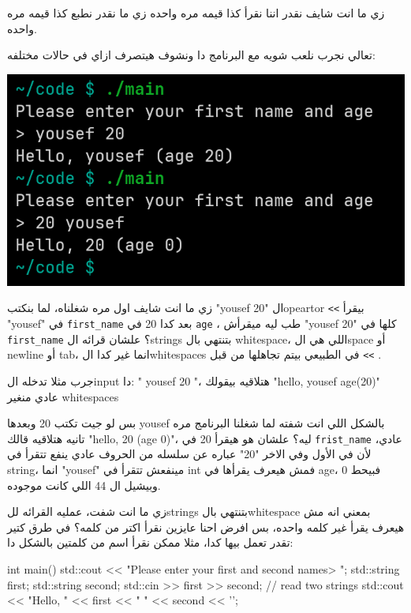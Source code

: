 \documentclass[11pt]{article}
\let\OriginalVerbatim\verbatim
\let\endOriginalVerbatim\endverbatim
\renewenvironment{verbatim}{\begin{english}\OriginalVerbatim}{\endOriginalVerbatim\end{english}}
\begin{document}
زي ما انت شايف نقدر اننا نقرأ كذا قيمه مره واحده زي ما نقدر نطبع كذا قيمه مره واحده.

تعالي نجرب نلعب شويه مع البرنامج دا ونشوف هيتصرف ازاي في حالات مختلفه:

\begin{center}
\includegraphics[width=.9\linewidth]{../images/test_name_age.png}
\end{center}

زي ما انت شايف اول مره شغلناه، لما بنكتب "yousef 20" الopeartor \texttt{<{}<{}} بيقرأ "yousef" في \texttt{first\_name} بعد كدا 20 في \texttt{age} ، طب ليه ميقرأش "yousef 20" كلها في \texttt{first\_name} ؟ علشان قرائه الstrings بتنتهي بال whitespace، اللي هي الspace أو newline أو tab، انما غير كدا الwhitespaces في الطبيعي بيتم تجاهلها من قبل \texttt{<{}<{}} .

جرب مثلا تدخله الinput دا: "       yousef          20        "، هتلاقيه بيقولك "hello, yousef age(20)" عادي منغير whitespaces

بس لو جيت تكتب 20 وبعدها yousef بالشكل اللي انت شفته لما شغلنا البرنامج مره تانيه هتلاقيه قالك "hello, 20 (age 0)"، ليه؟ علشان هو هيقرأ 20 في \texttt{frist\_name} عادي، لأن في الأول وفي الاخر "20" عباره عن سلسله من الحروف عادي ينفع تتقرأ في string، انما "yousef" مينفعش تتقرأ في int فمش هيعرف يقرأها في age، فبيحط 0 وبيشيل ال 44 اللي كانت موجوده.

زي ما انت شفت، عمليه القرائه للstrings بتنتهي بالwhitespace بمعني انه مش هيعرف يقرأ غير كلمه واحده، بس افرض احنا عايزين نقرأ اكتر من كلمه؟ في طرق كتير تقدر تعمل بيها كدا، مثلا ممكن نقرأ اسم من كلمتين بالشكل دا:

\begin{verbatim}
int main() {
    std::cout << "Please enter your first and second names\n> ";
    std::string first;
    std::string second;
    std::cin >> first >> second;   // read two strings
    std::cout << "Hello, " << first << " " << second << '\n';
}
\end{verbatim}
\end{document}
